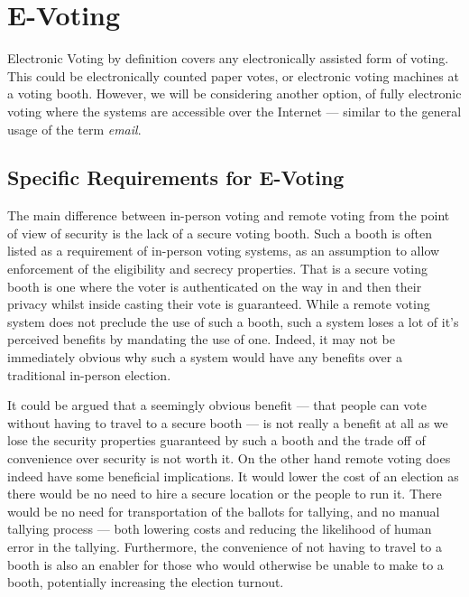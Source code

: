 
\chapter{E-Voting}
\label{ch:ev}

Electronic Voting by definition covers any electronically assisted form of voting. This could be electronically counted paper votes, or electronic voting machines at a voting booth. However, we will be considering another option, of fully electronic voting where the systems are accessible over the Internet --- similar to the general usage of the term \emph{email}.

\section{Specific Requirements for E-Voting}
\label{ch:ev:specific}

The main difference between in-person voting and remote voting from the point of view of security is the lack of a secure voting booth. Such a booth is often listed as a requirement of in-person voting systems, as an assumption to allow enforcement of the eligibility and secrecy properties. That is a secure voting booth is one where the voter is authenticated on the way in and then their privacy whilst inside casting their vote is guaranteed. While a remote voting system does not preclude the use of such a booth, such a system loses a lot of it's perceived benefits by mandating the use of one. Indeed, it may not be immediately obvious why such a system would have any benefits over a traditional in-person election.

It could be argued that a seemingly obvious benefit --- that people can vote without having to travel to a secure booth --- is not really a benefit at all as we lose the security properties guaranteed by such a booth and the trade off of convenience over security is not worth it. On the other hand remote voting does indeed have some beneficial implications. It would lower the cost of an election as there would be no need to hire a secure location or the people to run it. There would be no need for transportation of the ballots for tallying, and no manual tallying process --- both lowering costs and reducing the likelihood of human error in the tallying. Furthermore, the convenience of not having to travel to a booth is also an enabler for those who would otherwise be unable to make to a booth, potentially increasing the election turnout.

